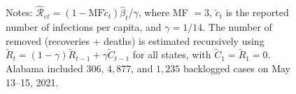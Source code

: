 \documentclass[12pt]{article}
\begin{document}
\begin{figure}[!p]
\begin{center}
\begin{tabular}
{\includegraphics[
height=1.7763in,
width=3.5293in
]%
{figs/US-Re-DE-2W.png}%
}
&
{\includegraphics[
height=1.7763in,
width=3.5293in
]%
{figs/US-Re-DC-2W.png}%
}
\end{tabular}



\end{center}

%

\vspace{-0.4cm}%
\footnotesize
{}Notes: $\mathcal{\hat{R}}_{et}=\left(  1-\text{MF}\tilde{c}_{t}\right)
\hat{\beta}_{t}/\gamma$, where MF $=3$, $\tilde{c}_{t}$ is the reported number
of infections per capita, and $\gamma=1/14$. The number of removed (recoveries
+ deaths) is estimated recursively using $\tilde{R}_{t}=\left(  1-\gamma
\right)  \tilde{R}_{t-1}+\gamma\tilde{C}_{t-1}$ for all states, with
$\tilde{C}_{1}=\tilde{R}_{1}=0$. Alabama included $306$, $4,877$, and $1,235$
backlogged cases on May 13--15, 2021.%

\end{figure}%
%

\addtocounter{figure}{-1}%
%
\end{document}
